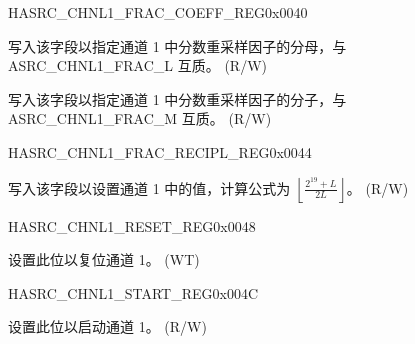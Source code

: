 \begin{register}{H}{ASRC\_CHNL1\_FRAC\_COEFF\_REG}{0x0040}\label{regdesc:ASRCCHNL1FRACCOEFFREG}
%
%
%
\regnewline%
\begin{regdesc}\begin{reglist}
\label{fielddesc:ASRCCHNL1FRACM}\item [ASRC\_CHNL1\_FRAC\_M] 写入该字段以指定通道 1 中分数重采样因子的分母，与 ASRC\_CHNL1\_FRAC\_L 互质。 (R/W)
\label{fielddesc:ASRCCHNL1FRACL}\item [ASRC\_CHNL1\_FRAC\_L] 写入该字段以指定通道 1 中分数重采样因子的分子，与 ASRC\_CHNL1\_FRAC\_M 互质。 (R/W)


\end{reglist}\end{regdesc}
\end{register}


\begin{register}{H}{ASRC\_CHNL1\_FRAC\_RECIPL\_REG}{0x0044}\label{regdesc:ASRCCHNL1FRACRECIPLREG}
%
%
\regnewline%
\begin{regdesc}\begin{reglist}
\label{fielddesc:ASRCCHNL1FRACRECIPL}\item [ASRC\_CHNL1\_FRAC\_RECIPL] 写入该字段以设置通道 1 中的值，计算公式为  \(\left\lfloor \frac{2^{19} + L}{2L} \right\rfloor\)。 (R/W)
\end{reglist}\end{regdesc}
\end{register}


\begin{register}{H}{ASRC\_CHNL1\_RESET\_REG}{0x0048}\label{regdesc:ASRCCHNL1RESETREG}
%
%
\regnewline%
\begin{regdesc}\begin{reglist}
\label{fielddesc:ASRCCHNL1RESET}\item [ASRC\_CHNL1\_RESET] 设置此位以复位通道 1。 (WT)
\end{reglist}\end{regdesc}
\end{register}


\begin{register}{H}{ASRC\_CHNL1\_START\_REG}{0x004C}\label{regdesc:ASRCCHNL1STARTREG}
%
%
\regnewline%
\begin{regdesc}\begin{reglist}
\label{fielddesc:ASRCCHNL1START}\item [ASRC\_CHNL1\_START] 设置此位以启动通道 1。 (R/W)
\end{reglist}\end{regdesc}
\end{register}


